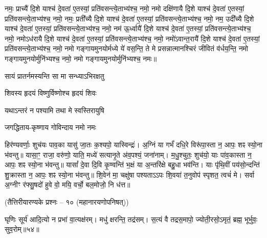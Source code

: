 
नमः॒ प्राच्यै॑ दि॒शे याश्च॑ दे॒वता॑ ए॒तस्यां॒ प्रति॑वसन्त्ये॒ताभ्य॑श्च॒  नमो॒ नमो दक्षि॑णायै दि॒शे याश्च॑ दे॒वता॑ ए॒तस्यां॒ प्रति॑वसन्त्ये॒ताभ्य॑श्च॒  नमो॒ नमः॒ प्रती᳚च्यै दि॒शे याश्च॑ दे॒वता॑ ए॒तस्यां॒ प्रति॑वसन्त्ये॒ताभ्य॑श्च॒  नमो॒ नम॒ उदी᳚च्यै दि॒शे याश्च॑ दे॒वता॑ ए॒तस्यां॒ प्रति॑वसन्त्ये॒ताभ्य॑श्च॒  नमो॒ नम॑ ऊ॒र्ध्वायै॑ दि॒शे याश्च॑ दे॒वता॑ ए॒तस्यां॒ प्रति॑वसन्त्ये॒ताभ्य॑श्च॒  नमो॒ नमोऽध॑रायै दि॒शे याश्च॑ दे॒वता॑ ए॒तस्यां॒ प्रति॑वसन्त्ये॒ताभ्य॑श्च॒  नमो॒ नमो॑ऽवान्त॒रायै॑ दि॒शे याश्च॑ दे॒वता॑ ए॒तस्यां॒ प्रति॑वसन्त्ये॒ताभ्य॑श्च॒  नमो॒ नमो गङ्गायमुनयोर्मध्ये ये॑ वस॒न्ति॒ ते मे प्रसन्नात्मानश्चिरं जीवितं व॑र्धय॒न्ति॒ नमो गङ्गायमुनयोर्मुनि॑भ्यश्च॒ नमो॒ नमो गङ्गायमुनयोर्मुनि॑भ्यश्च॒ नमः॥

{सायं प्रातर्नमस्यन्ति सा मा सन्ध्याऽभिरक्षतु}

{शिवस्य हृदयं विष्णुर्विष्णोश्च हृदयं शिवः}

{यथाऽन्तरं न पश्यामि तथा मे स्वस्तिरायुषि}

{जगद्धिताय-कृष्णाय गोविन्दाय नमो नमः}

\clearpage{}\label{sec:start}
 

\closesection

हिर॑ण्यवर्णाः॒ शुच॑यः पाव॒का यासु॑ जा॒तः क॒श्यपो॒ यास्विन्द्रः॑।
अ॒ग्निं या गर्भं॑ दधि॒रे विरू॑पा॒स्ता न॒ आपः॒ शꣴ स्यो॒ना भ॑वन्तु॥ 
यासा॒ꣳ॒ राजा॒ वरु॑णो॒ याति॒ मध्ये॑ सत्यानृ॒ते अ॑व॒पश्यं॒ जना॑नाम्।
म॒धु॒श्चुतः॒ शुच॑यो॒ याः पा॑व॒कास्ता न॒ आपः॒ शꣴ स्यो॒ना भ॑वन्तु॥ 
यासां᳚ दे॒वा दि॒वि कृ॒ण्वन्ति॑ भ॒क्षं या अ॒न्तरि॑क्षे बहु॒धा भव॑न्ति।
याः पृ॑थि॒वीं पय॑सो॒न्दन्ति॑ शु॒क्रास्ता न॒ आपः॒ शꣴ स्यो॒ना भ॑वन्तु॥ 
शि॒वेन॑ मा॒ चक्षु॑षा पश्यताऽऽपः शि॒वया॑ त॒नुवोप॑ स्पृशत॒ त्वचं॑ मे।
सर्वा अ॒ग्नीꣳ र॑फ्सु॒षदो॑ हुवे वो॒ मयि॒ वर्चो॒ बल॒मोजो॒ नि ध॑त्त॥
\clearpage

 
\clearpage

 


\centerline{\scriptsize (तैत्तिरीयारण्यके प्रश्नः – १० (महानारयणोपनिषत्))}

घृणिः सूर्य॑ आदि॒त्यो न प्रभा॑ वा॒त्यक्ष॑रम्। 
मधु॑ क्षरन्ति॒ तद्र॑सम्। 
स॒त्यं वै तद्रस॒मापो॒ ज्योती॒रसो॒ऽमृतं॒ ब्रह्म॒ भूर्भुवः॒ सुव॒रोम्॥५४॥

